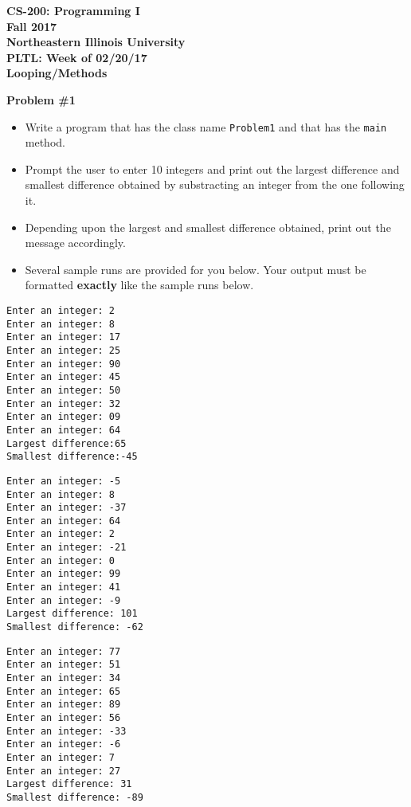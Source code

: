 \documentclass[12pt]{article}
\begin{document}
\begin{center}
	\textbf{CS-200: Programming I}\\
	\textbf{Fall 2017}\\
	\textbf{Northeastern Illinois University}\\
	\textbf{PLTL: Week of 02/20/17}\\
	\textbf{Looping/Methods}
\end{center}


\noindent\textbf{Problem \#1}
\begin{itemize}
	\item Write a program that has the class name \texttt{Problem1} and that has the \texttt{main} method.
	\item Prompt the user to enter 10 integers and print out the largest difference and smallest difference obtained by substracting an integer from the one following it.
	\item Depending upon the largest and smallest difference obtained, print out the message accordingly.
	\item Several sample runs are provided for you below. Your output must be formatted \textbf{exactly} like the sample runs below. 
\end{itemize}
\begin{center}
\begin{minipage}{4cm}
\begin{lstlisting}
Enter an integer: 2
Enter an integer: 8
Enter an integer: 17
Enter an integer: 25
Enter an integer: 90
Enter an integer: 45
Enter an integer: 50
Enter an integer: 32
Enter an integer: 09
Enter an integer: 64
Largest difference:65
Smallest difference:-45 
\end{lstlisting}
\end{minipage}
\hspace*{0.5cm}
\begin{minipage}{4cm}
\begin{lstlisting}
Enter an integer: -5
Enter an integer: 8
Enter an integer: -37
Enter an integer: 64
Enter an integer: 2
Enter an integer: -21
Enter an integer: 0
Enter an integer: 99
Enter an integer: 41
Enter an integer: -9
Largest difference: 101
Smallest difference: -62

\end{lstlisting}
\end{minipage}
\hspace*{0.5cm}
\begin{minipage}{4cm}
\begin{lstlisting}
Enter an integer: 77
Enter an integer: 51
Enter an integer: 34
Enter an integer: 65
Enter an integer: 89
Enter an integer: 56
Enter an integer: -33
Enter an integer: -6
Enter an integer: 7
Enter an integer: 27
Largest difference: 31
Smallest difference: -89

\end{lstlisting}
\end{minipage}\\
\end{center}
\end{document}
